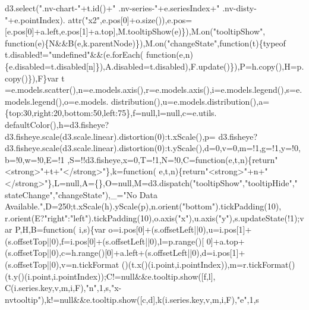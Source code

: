 \begin{DoxyCode}
      d3.select(\textcolor{stringliteral}{".nv-chart-"}+t.id()+\textcolor{stringliteral}{" .nv-series-"}+e.seriesIndex+\textcolor{stringliteral}{" .nv-disty-"}+e.pointIndex).
      attr(\textcolor{stringliteral}{"x2"},e.pos[0]+o.size()),e.pos=[e.pos[0]+a.left,e.pos[1]+a.top],M.tooltipShow(e)\}),M.on(\textcolor{stringliteral}{"tooltipShow"},\textcolor{keyword}{
      function}(e)\{N&&B(e,k.parentNode)\}),M.on(\textcolor{stringliteral}{"changeState"},\textcolor{keyword}{function}(t)\{typeof t.disabled!=\textcolor{stringliteral}{"undefined"}&&(e.forEach(\textcolor{keyword}{
      function}(e,n)\{e.disabled=t.disabled[n]\}),A.disabled=t.disabled),F.update()\}),P=h.copy(),H=p.copy()\}),F\}var t
      =e.models.scatter(),n=e.models.axis(),r=e.models.axis(),i=e.models.legend(),s=e.models.legend(),o=e.models.
      distribution(),u=e.models.distribution(),a=\{top:30,right:20,bottom:50,left:75\},f=null,l=null,c=e.utils.
      defaultColor(),h=d3.fisheye?d3.fisheye.scale(d3.scale.linear).distortion(0):t.xScale(),p=
      d3.fisheye?d3.fisheye.scale(d3.scale.linear).distortion(0):t.yScale(),d=0,v=0,m=!1,g=!1,y=!0,b=!0,w=!0,E=!1
      ,S=!!d3.fisheye,x=0,T=!1,N=!0,C=\textcolor{keyword}{function}(e,t,n)\{\textcolor{keywordflow}{return}\textcolor{stringliteral}{"<strong>"}+t+\textcolor{stringliteral}{"</strong>"}\},k=\textcolor{keyword}{function}(
      e,t,n)\{\textcolor{keywordflow}{return}\textcolor{stringliteral}{"<strong>"}+n+\textcolor{stringliteral}{"</strong>"}\},L=null,A=\{\},O=null,M=d3.dispatch(\textcolor{stringliteral}{"tooltipShow"},\textcolor{stringliteral}{"tooltipHide"},\textcolor{stringliteral}{"
      stateChange"},\textcolor{stringliteral}{"changeState"}),\_=\textcolor{stringliteral}{"No Data Available."},D=250;t.xScale(h).yScale(p),n.orient(\textcolor{stringliteral}{"bottom"}).tickPadding(10),
      r.orient(E?\textcolor{stringliteral}{"right"}:\textcolor{stringliteral}{"left"}).tickPadding(10),o.axis(\textcolor{stringliteral}{"x"}),u.axis(\textcolor{stringliteral}{"y"}),s.updateState(!1);var P,H,B=\textcolor{keyword}{function}(
      i,s)\{var o=i.pos[0]+(s.offsetLeft||0),u=i.pos[1]+(s.offsetTop||0),f=i.pos[0]+(s.offsetLeft||0),l=p.range()[
      0]+a.top+(s.offsetTop||0),c=h.range()[0]+a.left+(s.offsetLeft||0),d=i.pos[1]+(s.offsetTop||0),v=n.tickFormat
      ()(t.x()(i.point,i.pointIndex)),m=r.tickFormat()(t.y()(i.point,i.pointIndex));C!=null&&e.tooltip.show([f,l],
      C(i.series.key,v,m,i,F),\textcolor{stringliteral}{"n"},1,s,\textcolor{stringliteral}{"x-nvtooltip"}),k!=null&&e.tooltip.show([c,d],k(i.series.key,v,m,i,F),\textcolor{stringliteral}{"e"},1,s

\end{DoxyCode}
